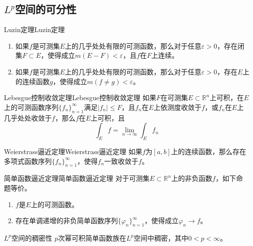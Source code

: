 \documentclass[lang = cn, scheme = chinese, thmcnt = section]{elegantbook}
\newcommand{\R}{\mathbb{R}}            %
\newcommand{\sub}{\subset}             %
\begin{document}
\subsection{$L^p$空间的可分性}

\begin{theorem}{Luzin定理}{Luzin定理}
	\begin{enumerate}
		\item 如果$f$是可测集$E$上的几乎处处有限的可测函数，那么对于任意$\varepsilon>0$，存在闭集$F\sub E$，使得成立$m(E-F)<\varepsilon$，且$f$在$F$上连续。
		\item 如果$f$是可测集$E$上的几乎处处有限的可测函数，那么对于任意$\varepsilon>0$，存在$E$上的连续函数$g$，使得成立$m(f\ne g)<\varepsilon$。
	\end{enumerate}
\end{theorem}

\begin{theorem}{Lebesgue控制收敛定理}{Lebesgue控制收敛定理}
	如果$F$在可测集$E\sub\R^n$上可积，在$E$上的可测函数序列$\{ f_n \}_{n=1}^{\infty}$满足$|f_n|\le F$，且$f_n$在$E$上依测度收敛于$f$，或$f_n$在$E$上几乎处处收敛于$f$，那么$f$在$E$上可积，且
	$$
	\int_Ef=\lim_{n\to\infty}\int_Ef_n
	$$
\end{theorem}

\begin{theorem}{Weierstrass逼近定理}{Weierstrass逼近定理}
	如果$f$为$[a,b]$上的连续函数，那么存在多项式函数序列$\{f_n\}_{n=1}^{\infty}$，使得$f_n$一致收敛于$f$。
\end{theorem}

\begin{theorem}{简单函数逼近定理}{简单函数逼近定理}
	对于可测集$E\sub\R^n$上的非负函数$f$，如下命题等价。
	\begin{enumerate}
		\item $f$是$E$上的可测函数。
		\item 存在单调递增的非负简单函数序列$\{ \varphi_n \}_{n=1}^{\infty}$，使得成立$\varphi_n\to f$。
	\end{enumerate}
\end{theorem}

\begin{theorem}{$L^p$空间的稠密性}
	$p$次幂可积简单函数族在$L^p$空间中稠密，其中$0<p<\infty$。
\end{theorem}
\end{document}
